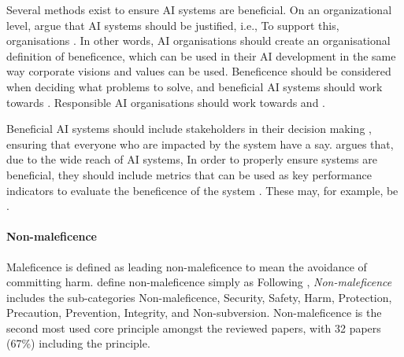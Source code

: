 Several methods exist to ensure AI systems are beneficial. On an organizational level, \textcite[p. 2151]{Morley_2020} argue that AI systems should be justified, i.e.,  To support this, organisations  \parencite[p. 9]{vanBruxvoort_2021}. In other words, AI organisations should create an organisational definition of beneficence, which can be used in their AI development in the same way corporate visions and values can be used. Beneficence should be considered when deciding what problems to solve, and beneficial AI systems should work towards  \parencite[p. 73]{Ryan_2021}. Responsible AI organisations should work towards   and  \parencite[p. 11]{Jobin_2019}.

Beneficial AI systems should include stakeholders in their decision making \parencite{Lu_2022,Havrda_2020,Morley_2020}, ensuring that everyone who are impacted by the system have a say. \textcite[p. 134]{Nevanperä_2021} argues that, due to the wide reach of AI systems,  In order to properly ensure systems are beneficial, they should include metrics that can be used as key performance indicators to evaluate the beneficence of the system \parencite{Eitel-Porter_2021}. These may, for example, be  \parencite[p. 5]{Havrda_2020}.


\paragraph{Non-maleficence}
Maleficence is defined as  leading non-maleficence to mean the avoidance of committing harm. \textcite[p. 697]{Floridi_2018} define non-maleficence simply as  Following \textcite{Ryan_2021}, \textit{Non-maleficence} includes the sub-categories Non-maleficence, Security, Safety, Harm, Protection, Precaution, Prevention, Integrity, and Non-subversion. Non-maleficence is the second most used core principle amongst the reviewed papers, with 32 papers (67\%) including the principle.

